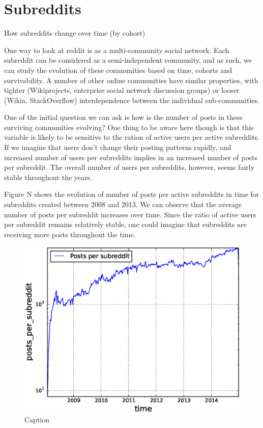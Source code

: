 \section{Subreddits}

How subreddits change over time (by cohort)

One way to look at reddit is as a multi-community social network. Each subreddit can be considered as a semi-independent community, and as such, we can study the evolution of these communities based on time, cohorts and survivability.  A number of other online communities have similar properties, with tighter (Wikiprojects, enterprise social network discussion groups) or looser (Wikia, StackOverflow) interdependence between the individual sub-communities.

One of the initial question we can ask is how is the number of posts in these surviving communities evolving? One thing to be aware here though is that this variable is likely to be sensitive to the ration of active users per active subreddits. If we imagine that users don't change their posting patterns rapidly, and increased number of users per subreddits implies in an increased number of posts per subreddit. The overall number of users per subreddits, however, seems fairly stable throughout the years.

Figure N shows the evolution of number of posts per active subreddits in time for subreddits created between 2008 and 2013. We can observe that the average number of posts per subreddit increases over time. Since the ratio of active users per subreddit remains relatively stable, one could imagine that subreddits are receiving more posts throughout the time.

\begin{figure}[!tb]
\centering
\includegraphics[scale=0.4]{./images/posts_per_subreddit_over_time_total.eps}
\caption{Caption}
\label{fig:posts_per_subreddit_over_time_total}
\end{figure}

